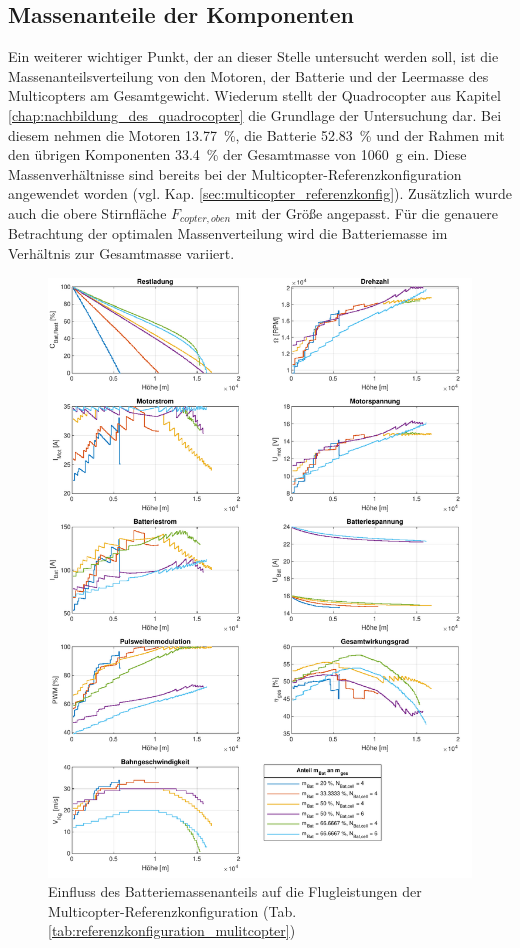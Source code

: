 \subsection{Massenanteile der Komponenten}
\label{subsec:massenverteilung}
Ein weiterer wichtiger Punkt, der an dieser Stelle untersucht werden soll, ist die Massenanteilsverteilung von den Motoren, der Batterie und der Leermasse des Multicopters am Gesamtgewicht. Wiederum stellt der Quadrocopter aus Kapitel \ref{chap:nachbildung_des_quadrocopter} die Grundlage der Untersuchung dar. Bei diesem nehmen die Motoren \SI{13,77}{\%}, die Batterie \SI{52,83}{\%} und der Rahmen mit den übrigen Komponenten \SI{33,4}{\%} der Gesamtmasse von \SI{1060}{g} ein. Diese Massenverhältnisse sind bereits bei der Multicopter-Referenzkonfiguration angewendet worden (vgl. Kap. \ref{sec:multicopter_referenzkonfig}). Zusätzlich wurde auch die obere Stirnfläche \ensuremath{F_{copter,oben}} mit der Größe angepasst. Für die genauere Betrachtung der optimalen Massenverteilung wird die Batteriemasse im Verhältnis zur Gesamtmasse variiert.

\begin{figure}[H]
\centering
	\includegraphics[scale=0.70]{Diagramme/Batteriemasse.pdf}
	\caption{Einfluss des Batteriemassenanteils auf die Flugleistungen der Multicopter-Referenzkonfiguration (Tab. \ref{tab:referenzkonfiguration_mulitcopter})}
	\label{abb:batteriemasse}
\end{figure}

